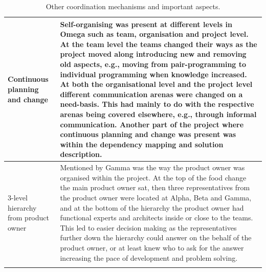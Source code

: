 \begin{center}
\begin{longtable}{| p{6cm} | p{9cm} |}
    Continuous planning and change & Self-organising was present at different levels in Omega such as team, organisation and project level. At the team level the teams changed their ways as the project moved along introducing new and removing old aspects, e.g., moving from pair-programming to individual programming when knowledge increased. At both the organisational level and the project level different communication arenas were changed on a need-basis. This had mainly to do with the respective arenas being covered elsewhere, e.g., through informal communication. Another part of the project where continuous planning and change was present was within the dependency mapping and solution description. \\ \hline
    3-level hierarchy from product owner & Mentioned by Gamma was the way the product owner was organised within the project. At the top of the food change the main product owner sat, then three representatives from the product owner were located at Alpha, Beta and Gamma, and at the bottom of the hierarchy the product owner had functional experts and architects inside or close to the teams. This led to easier decision making as the representatives further down the hierarchy could answer on the behalf of the product owner, or at least knew who to ask for the answer increasing the pace of development and problem solving. \\ \hline

    \caption{Other coordination mechanisms and important aspects.}
    \label{ocmaia}
    \end{longtable}
\end{center}




